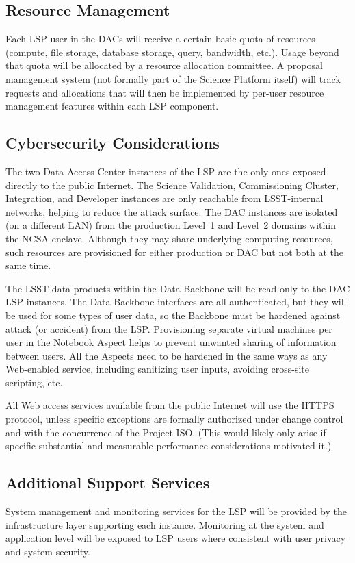 \subsection{Resource Management}\label{resource-management}

Each LSP user in the DACs will receive a certain basic quota of resources
(compute, file storage, database storage, query, bandwidth, etc.).
Usage beyond that quota will be allocated by a resource allocation committee.
A proposal management system (not formally part of the Science Platform itself)
will track requests and allocations that will then be implemented by per-user
resource management features within each LSP component.

\subsection{Cybersecurity Considerations}\label{cybersecurity-considerations}

The two Data Access Center instances of the LSP are the only ones exposed
directly to the public Internet.
The Science Validation, Commissioning Cluster,
Integration, and Developer instances are only reachable from LSST-internal
networks, helping to reduce the attack surface.
The DAC instances are isolated (on a different LAN) from the production
Level~1 and Level~2 domains within the NCSA enclave.
Although they may share underlying computing resources, such
resources are provisioned for either production or DAC but not both at the
same time.

The LSST data products within the Data Backbone will be read-only to the DAC
LSP instances.
The Data Backbone interfaces are all authenticated,
but they will be used for some types of user data, so the Backbone must be
hardened against attack (or accident) from the LSP.
Provisioning separate virtual machines per user in the Notebook Aspect helps
to prevent unwanted sharing of information between users.
All the Aspects
need to be hardened in the same ways as any Web-enabled service, including
sanitizing user inputs, avoiding cross-site scripting, etc.

All Web access services available from the public Internet will use the HTTPS
protocol, unless specific exceptions are formally authorized under change
control and with the concurrence of the Project ISO.
(This would likely only arise if specific substantial and measurable
performance considerations motivated it.)

\subsection{Additional Support Services}\label{additional-support-services}

System management and monitoring services for the LSP will be provided by the
infrastructure layer supporting each instance.  Monitoring at the system and
application level will be exposed to LSP users where consistent with user
privacy and system security.
